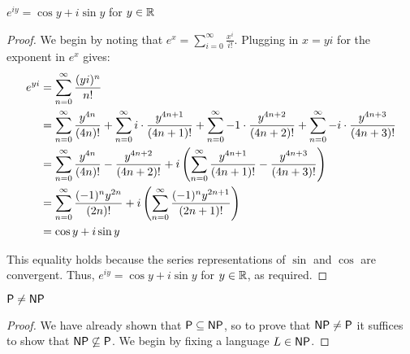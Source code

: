 \documentclass[name=Ojas\ Chaturvedi, emailid=oj.chaturvedi.2024, course=Course\ Name, num=1, deadline=Enter\ Deadline\ Here]{homework}
\begin{document}
\begin{claim}
    $e^{iy} = \cos y + i \sin y$ for $y \in \mathbb{R}$
\end{claim}
\begin{proof}
    We begin by noting that $e^x = \sum_{i = 0}^\infty \frac{x^i}{i!}$. Plugging in $x = yi$ for the exponent in $e^x$ gives:
    \begin{align*}
    e^{yi} &= \sum_{n = 0}^\infty \frac{(yi)^n}{n!} \\
    &= \sum_{n = 0}^\infty \frac{y^{4n}}{(4n)!} + \sum_{n = 0}^\infty i \cdot \frac{y^{4n + 1}}{(4n + 1)!} + \sum_{n = 0}^\infty -1 \cdot \frac{y^{4n + 2}}{(4n + 2)!} + \sum_{n = 0}^\infty -i \cdot \frac{y^{4n + 3}}{(4n + 3)!} \\
    &= \sum_{n = 0}^\infty \frac{y^{4n}}{(4n)!} - \frac{y^{4n + 2}}{(4n + 2)!} + i \left(  \sum_{n = 0}^\infty \frac{y^{4n + 1}}{(4n + 1)!} - \frac{y^{4n + 3}}{(4n + 3)!}  \right) \\
    &= \sum_{n = 0}^\infty \frac{(-1)^n y^{2n}}{(2n)!} + i \left( \sum_{n = 0}^\infty \frac{(-1)^n y^{2n + 1}}{(2n + 1)!} \right) \\
    &= \cos y + i \sin y
    \end{align*} 
    
    This equality holds because the series representations of $\sin$ and $\cos$ are convergent. Thus, $e^{iy} = \cos y + i \sin y$ for $y \in \mathbb{R}$, as required.
\end{proof}
\newpage

\begin{claim}
    $\mathsf{P} \neq \mathsf{NP}$
\end{claim}

\begin{proof}
    We have already shown that $\mathsf{P} \subseteq \mathsf{NP}$, so to prove that $\mathsf{NP} \neq \mathsf{P}$ it suffices to show that $\mathsf{NP} \not \subseteq \mathsf{P}$. We begin by fixing a language $L \in \mathsf{NP}$. 
    
    \todo %
\end{proof}
\newpage

\end{document}
